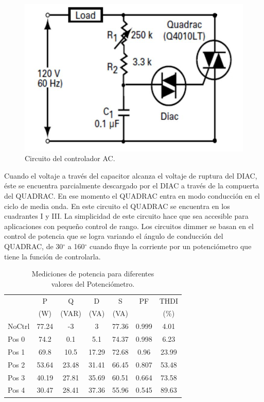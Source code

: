 \documentclass[journal]{IEEEtran}
\begin{document}
\begin{figure}[h]
\centering
\includegraphics[clip,width=\columnwidth]{controller.png}
\caption{Circuito del controlador AC.}
\label{ACcontroller}
\end{figure}

Cuando el voltaje a través del capacitor alcanza el 
voltaje de ruptura del DIAC, éste se encuentra 
parcialmente descargado por el DIAC a través de la 
compuerta del QUADRAC. En ese momento el QUADRAC 
entra en modo conducción en el ciclo de media onda. 
En este circuito el QUADRAC se encuentra en los 
cuadrantes I y III. La simplicidad de este circuito 
hace que sea accesible para aplicaciones con pequeño 
control de rango. Los circuitos dimmer se basan en el 
control de potencia que se logra variando el ángulo de 
conducción del QUADRAC, de 30$^{\circ}$ a 160$^{\circ}$ 
cuando fluye la 
corriente por un potenciómetro que tiene la función de 
controlarla. \\

\begin{table}[h]
\begin{tabular}{|p{1.2cm}|c|c|c|c|c|c|}
\hline 
 & P  & Q  & D  & S  & PF & THDI  \\
 &(W) & (VAR) &(VA) & (VA) &  & (\%) \\ \hline  
NoCtrl & 77.24 & -3 & 3 & 77.36 & 0.999 & 4.01 \\ 
\hline 
Pos 0 & 74.2 & 0.1 & 5.1 & 74.37 & 0.998 & 6.23 \\ 
\hline 
Pos 1 & 69.8 & 10.5 & 17.29 & 72.68 & 0.96 & 23.99 \\
\hline 
Pos 2 & 53.64 & 23.48 & 31.41 & 66.45 & 0.807 & 53.48 \\
\hline 
Pos 3 & 40.19 & 27.81 & 35.69 & 60.51 & 0.664 & 73.58 \\ 
\hline
Pos 4 & 30.47 & 28.41 & 37.36 & 55.96 & 0.545 & 89.63 \\ 
\hline 
\end{tabular}
\caption{Mediciones de potencia para diferentes \\ valores 
del Potenciómetro.}
\end{table}
\end{document}
